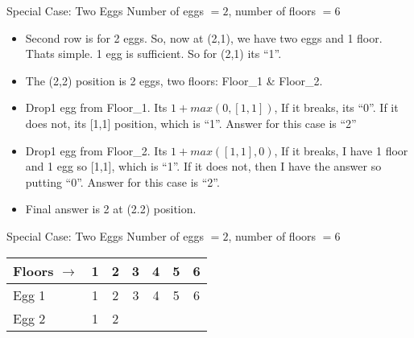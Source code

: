    \begin{frame}[fragile]{Special Case: Two Eggs}
 Number of eggs $= 2$, number of floors $=6$
\begin{itemize}
\item Second row is for 2 eggs. So, now at (2,1), we have two eggs and 1 floor. Thats simple. 1 egg is sufficient. So for (2,1) its ``1''.
\item The (2,2) position is 2 eggs, two floors: Floor\_1 \& Floor\_2.
\item Drop1 egg from Floor\_1. Its $ 1 + max(0, [1,1])$, If it breaks, its ``0''. If it does not, its [1,1] position, which is ``1''. Answer for this case is ``2''
\item Drop1 egg from Floor\_2. Its $ 1 + max([1,1],0)$, If it breaks, I have 1 floor and 1 egg so [1,1], which is ``1''. If it does not, then I have the answer so putting ``0''. Answer for this case is ``2''.
\item Final answer is 2 at (2.2) position.
\end{itemize}

\end{frame}


   \begin{frame}[fragile]{Special Case: Two Eggs}
 Number of eggs $= 2$, number of floors $=6$
 \begin{center}
 \begin{tabular}{|l|c|c|c|c|c|c|}
 \hline
Floors $\rightarrow$ & 1 &  2 &   3 &   4 & 5 &  6\\  \hline
Egg 1 & 1 & 2 & 3 & 4 & 5 & 6\\
Egg 2 & 1 & 2\\
 \hline
 \end{tabular}
 \end{center}

\end{frame}


